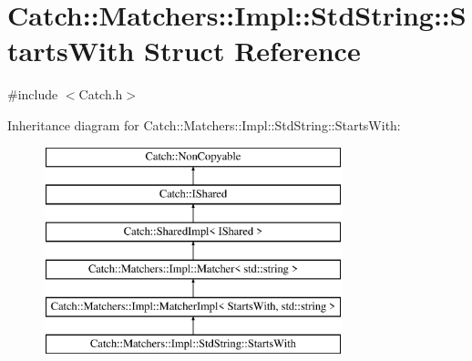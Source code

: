 \hypertarget{struct_catch_1_1_matchers_1_1_impl_1_1_std_string_1_1_starts_with}{}\section{Catch\+:\+:Matchers\+:\+:Impl\+:\+:Std\+String\+:\+:Starts\+With Struct Reference}
\label{struct_catch_1_1_matchers_1_1_impl_1_1_std_string_1_1_starts_with}


{\ttfamily \#include $<$Catch.\+h$>$}

Inheritance diagram for Catch\+:\+:Matchers\+:\+:Impl\+:\+:Std\+String\+:\+:Starts\+With\+:\begin{figure}[H]
\begin{center}
\leavevmode
\includegraphics[height=6.000000cm]{struct_catch_1_1_matchers_1_1_impl_1_1_std_string_1_1_starts_with}
\end{center}
\end{figure}
